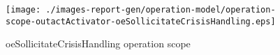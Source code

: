 \begin{figure}[htbp]
\begin{center}

\texttt{[image: ./images-report-gen/operation-model/operation-scope-outactActivator-oeSollicitateCrisisHandling.eps]}
\end{center}
\caption[lu.uni.lassy.icrash.spec.messir.reference Operation Scope: operation-scope-outactActivator-oeSollicitateCrisisHandling]{oeSollicitateCrisisHandling operation scope
}
\label{fig:lu.uni.lassy.icrash.spec.messir.reference-OM-scopeView-operation-scope-outactActivator-oeSollicitateCrisisHandling}
\end{figure}
\vspace{0.5cm}

